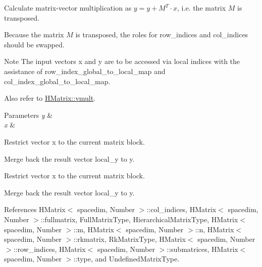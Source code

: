 Calculate matrix-\/vector multiplication as $y = y + M^T \cdot x$, i.\+e. the matrix $M$ is transposed.

Because the matrix $M$ is transposed, the roles for {\ttfamily row\+\_\+indices} and {\ttfamily col\+\_\+indices} should be swapped.


\begin{DoxyDescription}
\item[Note ]The input vectors {\ttfamily x} and {\ttfamily y} are to be accessed via local indices with the assistance of {\ttfamily row\+\_\+index\+\_\+global\+\_\+to\+\_\+local\+\_\+map} and {\ttfamily col\+\_\+index\+\_\+global\+\_\+to\+\_\+local\+\_\+map}. 
\end{DoxyDescription}

Also refer to \hyperlink{classHMatrix_aa11b5761aba86606effd14b4bdf31912}{H\+Matrix\+::vmult}. 
\begin{DoxyParams}{Parameters}
{\em y} & \\
\hline
{\em x} & \\
\hline
\end{DoxyParams}
Restrict vector x to the current matrix block.

Merge back the result vector {\ttfamily local\+\_\+y} to {\ttfamily y}.

Restrict vector x to the current matrix block.

Merge back the result vector {\ttfamily local\+\_\+y} to {\ttfamily y}.

References H\+Matrix$<$ spacedim, Number $>$\+::col\+\_\+indices, H\+Matrix$<$ spacedim, Number $>$\+::fullmatrix, Full\+Matrix\+Type, Hierarchical\+Matrix\+Type, H\+Matrix$<$ spacedim, Number $>$\+::m, H\+Matrix$<$ spacedim, Number $>$\+::n, H\+Matrix$<$ spacedim, Number $>$\+::rkmatrix, Rk\+Matrix\+Type, H\+Matrix$<$ spacedim, Number $>$\+::row\+\_\+indices, H\+Matrix$<$ spacedim, Number $>$\+::submatrices, H\+Matrix$<$ spacedim, Number $>$\+::type, and Undefined\+Matrix\+Type.

\mbox{\label{classHMatrix_a9ce6e0dd7cfa3dc0fff165d6ed819017}} 

